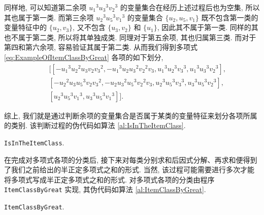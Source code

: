 \documentclass[10pt,a4paper]{ctexart}
\begin{document}
同样地, 可以知道第二余项 ${u_{{1}}}^{3}{u_{{3}}}^{3}{v_{{2}}}^{3}$ 的变量集合在经历上述过程后也为空集, 所以其也属于第一类. 而第三余项 ${u_{{2}}}^{3}{u_{{5}}}^{3}{v_{{1}}}^{3}$ 的变量集合 $\{u_2, u_5, v_1\}$ 既不包含第一类的变量特征中的 $\{u_2, v_3\}$, 又不包含 $\{u_3, v_2\}$ 和 $\{u_1\}$, 因此其不属于第一类. 同样的其也不属于第二类, 所以将其单独成类. 同理对于第五余项, 其也归属第三类. 而对于第四和第六余项, 容易验证其属于第二类. 从而我们得到多项式 \eqref{eq:ExampleOfItemClassByGreat} 各项的如下划分,
\begin{eqnarray*}
  && [[-{u_{{1}}}^{3}{u_{{2}}}^{2}u_{{3}}v_{{2}}{v_{{3}}}^{2}, -{u_{{1}}}^{3}u_{{2}}{u_{{3}}}^{2}{v_{{2}}}^{2}v_{{3}}, {u_{{1}}}^{3}{u_{{2}}}^{3}{v_{{3}}}^{3}, {u_{{1}}}^{3}{u_{{3}}}^{3}{v_{{2}}}^{3}],\\
  && [-{u_{{2}}}^{2}u_{{3}}{u_{{5}}}^{3}v_{{2}}{v_{{3}}}^{2}, -u_{{2}}{u_{{3}}}^{2}{u_{{5}}}^{3}{v_{{2}}}^{2}v_{{3}}, {u_{{2}}}^{3}{u_{{5}}}^{3}{v_{{3}}}^{3}, {u_{{3}}}^{3}{u_{{5}}}^{3}{v_{{2}}}^{3}],\\
  && [{u_{{2}}}^{3}{u_{{5}}}^{3}{v_{{1}}}^{3}, {u_{{3}}}^{3}{u_{{5}}}^{3}{v_{{1}}}^{3}]].
\end{eqnarray*}

综上, 我们就是通过判断余项的变量集合是否属于某类的变量特征来划分各项所属的类别. 该判断过程的伪代码如算法 \ref{al:IsInTheItemClass}.
\begin{algorithm}[!ht]
  \caption{\texttt{IsInTheItemClass}.}\label{al:IsInTheItemClass}
\end{algorithm}

在完成对多项式各项的分类后, 接下来对每类分别求和后因式分解、再求和便得到了我们之前给出的半正定多项式之和的形式. 当然, 该过程可能需要进行多次才能将多项式写成半正定多项式之和的形式. 对多项式各项的分类由程序 \texttt{ItemClassByGreat} 实现, 其伪代码如算法 \ref{al:ItemClassByGreat}.
\begin{algorithm}[!ht]
  \caption{\texttt{ItemClassByGreat}.\label{al:ItemClassByGreat}}
\end{algorithm}
\end{document}
